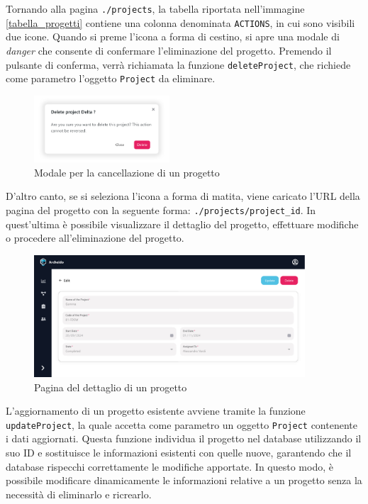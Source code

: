 \documentclass[target=bach,aauheader=,style=]{thud}
\begin{document}
\noindent Tornando alla pagina \texttt{./projects}, la tabella riportata nell'immagine \ref{tabella_progetti} contiene una colonna denominata \texttt{ACTIONS}, in cui sono visibili due icone. Quando si preme l'icona a forma di cestino, si apre una modale di \textit{danger} che consente di confermare l'eliminazione del progetto. Premendo il pulsante di conferma, verrà richiamata la funzione \texttt{deleteProject}, che richiede come parametro l'oggetto \texttt{Project} da eliminare.

\begin{figure}[H]
    \centering
    \includegraphics[width=0.45\textwidth]{img/interfacce/modal.pdf} 
    \caption{Modale per la cancellazione di un progetto}
\end{figure}

\noindent D'altro canto, se si seleziona l'icona a forma di matita, viene caricato l'URL della pagina del progetto con la seguente forma: \texttt{./projects/project\_id}. In quest'ultima è possibile visualizzare il dettaglio del progetto, effettuare modifiche o procedere all'eliminazione del progetto.

\begin{figure}[H]
    \centering
    \includegraphics[width=0.9\textwidth]{img/interfacce/table_edit.pdf} 
    \caption{Pagina del dettaglio di un progetto}
\end{figure}

\noindent L'aggiornamento di un progetto esistente avviene tramite la funzione \texttt{updateProject}, la quale accetta come parametro un oggetto \texttt{Project} contenente i dati aggiornati. Questa funzione individua il progetto nel database utilizzando il suo ID e sostituisce le informazioni esistenti con quelle nuove, garantendo che il database rispecchi correttamente le modifiche apportate. In questo modo, è possibile modificare dinamicamente le informazioni relative a un progetto senza la necessità di eliminarlo e ricrearlo.
\end{document}
